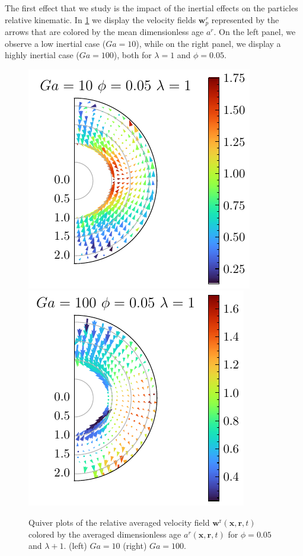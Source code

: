 The first effect that we study is the impact of the inertial effects on the particles relative kinematic.  
In \ref{fig:Why_Ga_matter} we display the velocity fields $\textbf{w}_p^r$ represented by the arrows that are colored by the mean dimensionless age $a^r$.  
On the left panel, we observe a low inertial case ($Ga = 10$), while on the right panel, we display a highly inertial case ($Ga=100$), both for $\lambda =1$ and $\phi=0.05$.
\begin{figure}[h!]
    \centering
    \includegraphics[height=0.35\textwidth]{image/HOMOGENEOUS_NEW/Dist/U_rel_l_1_Ga_10_PHI_5.pdf}
    \includegraphics[height=0.35\textwidth]{image/HOMOGENEOUS_NEW/Dist/U_rel_l_1_Ga_100_PHI_5.pdf}
    \caption{
         Quiver plots of the relative averaged velocity field $\textbf{w}^\text{r}(\textbf{x},\textbf{r},t)$ colored by the averaged dimensionless age $a^r(\textbf{x},\textbf{r},t)$ for $\phi = 0.05$ and $\lambda +1$.
         (left) $Ga = 10$ (right) $Ga =100$. }
    \label{fig:Why_Ga_matter}
\end{figure}

